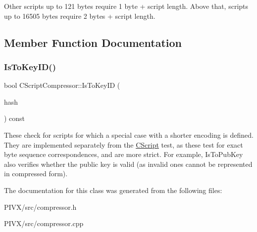 Other scripts up to 121 bytes require 1 byte + script length. Above that, scripts up to 16505 bytes require 2 bytes + script length. 

\subsection{Member Function Documentation}
\mbox{\label{class_c_script_compressor_a38e2dcfce62bb157b55536d73748f556}} 
\subsubsection{\texorpdfstring{Is\+To\+Key\+I\+D()}{IsToKeyID()}}
{\footnotesize\ttfamily bool C\+Script\+Compressor\+::\+Is\+To\+Key\+ID (\begin{DoxyParamCaption}\item[{\mbox{\hyperlink{class_c_key_i_d}{C\+Key\+ID}} \&}]{hash }\end{DoxyParamCaption}) const\hspace{0.3cm}{\ttfamily [protected]}}

These check for scripts for which a special case with a shorter encoding is defined. They are implemented separately from the \mbox{\hyperlink{class_c_script}{C\+Script}} test, as these test for exact byte sequence correspondences, and are more strict. For example, Is\+To\+Pub\+Key also verifies whether the public key is valid (as invalid ones cannot be represented in compressed form). 

The documentation for this class was generated from the following files\+:\begin{DoxyCompactItemize}
\item 
P\+I\+V\+X/src/compressor.\+h\item 
P\+I\+V\+X/src/compressor.\+cpp\end{DoxyCompactItemize}
